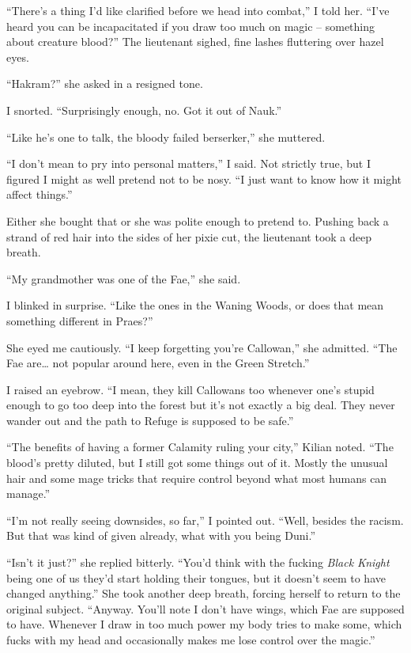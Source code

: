 \documentclass[12pt, openany]{book}
\begin{document}
“There’s a thing I’d like clarified before we head into combat,” I told her. “I’ve heard you can be incapacitated if you draw too much on magic – something about creature blood?”
The lieutenant sighed, fine lashes fluttering over hazel eyes.

“Hakram?” she asked in a resigned tone.

I snorted. “Surprisingly enough, no. Got it out of Nauk.”

“Like he’s one to talk, the bloody failed berserker,” she muttered.

“I don’t mean to pry into personal matters,” I said. Not strictly true, but I figured I might as well pretend not to be nosy. “I just want to know how it might affect things.”

Either she bought that or she was polite enough to pretend to. Pushing back a strand of red hair into the sides of her pixie cut, the lieutenant took a deep breath.

“My grandmother was one of the Fae,” she said.

I blinked in surprise. “Like the ones in the Waning Woods, or does that mean something different in Praes?”

She eyed me cautiously. “I keep forgetting you’re Callowan,” she admitted. “The Fae are… not popular around here, even in the Green Stretch.”

I raised an eyebrow. “I mean, they kill Callowans too whenever one’s stupid enough to go too deep into the forest but it’s not exactly a big deal. They never wander out and the path to Refuge is supposed to be safe.”

“The benefits of having a former Calamity ruling your city,” Kilian noted. “The blood’s pretty diluted, but I still got some things out of it. Mostly the unusual hair and some mage tricks that require control beyond what most humans can manage.”

“I’m not really seeing downsides, so far,” I pointed out. “Well, besides the racism. But that was kind of given already, what with you being Duni.”

“Isn’t it just?” she replied bitterly. “You’d think with the fucking \textit{Black Knight} being one of us they’d start holding their tongues, but it doesn’t seem to have changed anything.” She took another deep breath, forcing herself to return to the original subject. “Anyway. You’ll note I don’t have wings, which Fae are supposed to have. Whenever I draw in too much power my body tries to make some, which fucks with my head and occasionally makes me lose control over the magic.”
\end{document}
